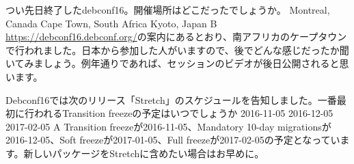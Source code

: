 %

\santaku
{つい先日終了したdebconf16。開催場所はどこだったでしょうか。}
{Montreal, Canada}
{Cape Town, South Africa}
{Kyoto, Japan}
{B}
{\url{https://debconf16.debconf.org/}の案内にあるとおり、南アフリカのケープタウンで行われました。日本から参加した人がいますので、後でどんな感じだったか聞いてみましょう。例年通りであれば、セッションのビデオが後日公開されると思います。}

\santaku
{Debconf16では次のリリース「Stretch」のスケジュールを告知しました。一番最初に行われるTransition freezeの予定はいつでしょうか}
{2016-11-05}
{2016-12-05}
{2017-02-05}
{A}
{Transition freezeが2016-11-05、Mandatory 10-day migrationsが2016-12-05、Soft freezeが2017-01-05、Full freezeが2017-02-05の予定となっています。新しいパッケージをStretchに含めたい場合はお早めに。}
